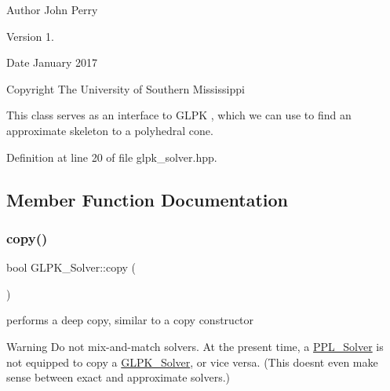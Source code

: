 \begin{DoxyAuthor}{Author}
John Perry 
\end{DoxyAuthor}
\begin{DoxyVersion}{Version}
1. 
\end{DoxyVersion}
\begin{DoxyDate}{Date}
January 2017 
\end{DoxyDate}
\begin{DoxyCopyright}{Copyright}
The University of Southern Mississippi
\end{DoxyCopyright}
This class serves as an interface to G\+L\+PK \cite{glpk}, which we can use to find an approximate skeleton to a polyhedral cone. 

Definition at line 20 of file glpk\+\_\+solver.\+hpp.



\subsection{Member Function Documentation}
\mbox{\label{class_g_l_p_k___solver_aff3a58ef3def363dfad9e0ba8eee3e67}} 
\subsubsection{\texorpdfstring{copy()}{copy()}}
{\footnotesize\ttfamily bool G\+L\+P\+K\+\_\+\+Solver\+::copy (\begin{DoxyParamCaption}\item[{const \hyperlink{class_l_p___solver}{L\+P\+\_\+\+Solver} $\ast$}]{ }\end{DoxyParamCaption})\hspace{0.3cm}{\ttfamily [virtual]}}



performs a deep copy, similar to a copy constructor 

\begin{DoxyWarning}{Warning}
Do not mix-\/and-\/match solvers. At the present time, a \hyperlink{class_p_p_l___solver}{P\+P\+L\+\_\+\+Solver} is not equipped to copy a \hyperlink{class_g_l_p_k___solver}{G\+L\+P\+K\+\_\+\+Solver}, or vice versa. (This doesn\textquotesingle{}t even make sense between exact and approximate solvers.) 
\end{DoxyWarning}


